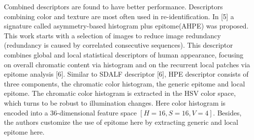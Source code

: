 \documentclass[conference,compsoc]{IEEEtran}
\begin{document}
Combined descriptors are found to have better performance. Descriptors combining color and texture are most often used in re-identification. In [5] a signature called asymmetry-based histogram plus epitome(AHPE) was proposed. This work starts with a selection of images to reduce image redundancy (redundancy is caused by correlated consecutive sequences). This descriptor combines global and local statistical descriptors of human appearance, focusing on overall chromatic content via histogram and on the recurrent local patches via epitome analysis [6]. Similar to SDALF descriptor [6], HPE descriptor consists of three components, the chromatic color histogram, the generic epitome and local epitome. The chromatic color histogram is extracted in the HSV color space, which turns to be robust to illumination changes. Here color histogram is encoded into a 36-dimensional feature space $[H=16,  S=16,  V=4]$. Besides, the authors customize the use of epitome here by extracting generic and local epitome here. 
\end{document}
